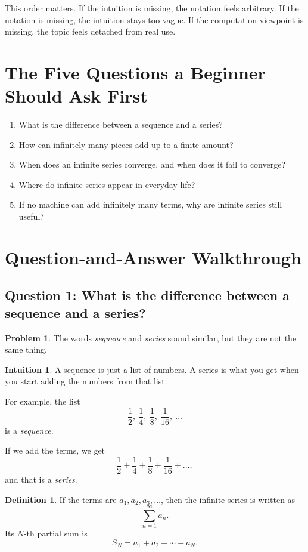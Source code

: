 \documentclass[11pt,a4paper]{article}
\theoremstyle{definition}
\newtheorem*{problem}{Problem}
\newtheorem*{intuition}{Intuition}
\newtheorem*{definitionblock}{Definition}
\theoremstyle{plain}
\begin{document}
This order matters.
If the intuition is missing, the notation feels arbitrary.
If the notation is missing, the intuition stays too vague.
If the computation viewpoint is missing, the topic feels detached from real use.

\section{The Five Questions a Beginner Should Ask First}

\begin{enumerate}
  \item What is the difference between a sequence and a series?
  \item How can infinitely many pieces add up to a finite amount?
  \item When does an infinite series converge, and when does it fail to converge?
  \item Where do infinite series appear in everyday life?
  \item If no machine can add infinitely many terms, why are infinite series still useful?
\end{enumerate}

\section{Question-and-Answer Walkthrough}

\subsection{Question 1: What is the difference between a sequence and a series?}

\begin{problem}
The words \emph{sequence} and \emph{series} sound similar, but they are not the same thing.
\end{problem}

\begin{intuition}
A sequence is just a list of numbers.
A series is what you get when you start adding the numbers from that list.
\end{intuition}

For example, the list
\[
\frac{1}{2},\ \frac{1}{4},\ \frac{1}{8},\ \frac{1}{16},\ \dots
\]
is a \emph{sequence}.

If we add the terms, we get
\[
\frac{1}{2}+\frac{1}{4}+\frac{1}{8}+\frac{1}{16}+\dots,
\]
and that is a \emph{series}.

\begin{definitionblock}
If the terms are \(a_1,a_2,a_3,\dots\), then the infinite series is written as
\[
\sum_{n=1}^{\infty} a_n.
\]
Its \(N\)-th partial sum is
\[
S_N = a_1+a_2+\cdots+a_N.
\]
\end{definitionblock}
\end{document}
